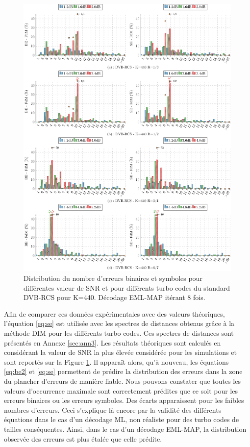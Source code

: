 \begin{figure}[!h] 
	\centering
	\hspace*{-1cm}
	\includegraphics[width=1.04\textwidth]{main/ch3_fig/be/dvb/tikz/be_440.pdf}
	\caption{Distribution du nombre d'erreurs binaires et symboles pour différentes valeur de SNR et pour différents turbo codes du 
	standard DVB-RCS pour K=440.	Décodage EML-MAP itérant 8 fois. \label{fig:be_dvb440}}
\end{figure}

Afin de comparer ces données expérimentales avec des valeurs théoriques, l'équation \ref{eq:se} est utilisée avec les 
spectres de distances obtenus grâce à la méthode DIM pour les différents turbo codes. Ces spectres de distances sont 
présentés en Annexe \ref{sec:ann3}. Les résultats théoriques sont calculés en considérant la valeur de SNR la plus élevée 
considérée pour les simulations et sont reportés sur la Figure \ref{fig:be_dvb440}. Il apparaît alors, qu'à nouveau, les équations
\ref{eq:be2} et \ref{eq:se} permettent de prédire la distribution des erreurs dans la zone du plancher d'erreurs de manière fiable. 
Nous pouvons constater que toutes les valeurs d’occurrence maximale sont correctement prédites que ce soit pour les erreurs binaires ou les 
erreurs symboles. Des écarts apparaissent pour les faibles nombres d'erreurs. Ceci s'explique là encore par la validité des
différents équations dans le cas d'un décodage ML, non réaliste pour des turbo codes de tailles conséquentes.
Ainsi, dans le cas d'un décodage EML-MAP, la distribution observée des erreurs est plus étalée que celle prédite.

